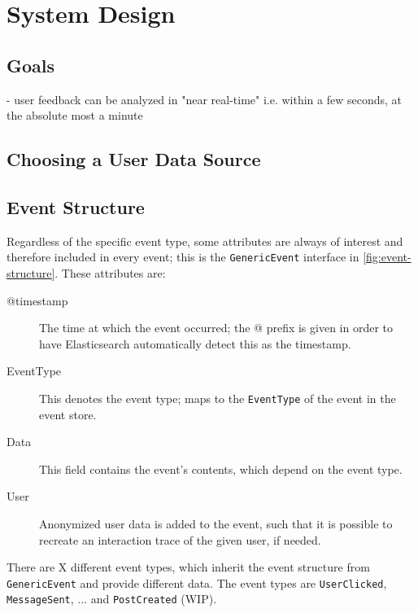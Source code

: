 %
\chapter{System Design}
\label{ch:design}

\section{Goals}
\label{sec:design:goals}

- user feedback can be analyzed in "near real-time" i.e. within a few seconds, at the absolute most a minute 

\section{Choosing a User Data Source}


\section{Event Structure}
\label{sec:design:event-structure}

Regardless of the specific event type, some attributes are always of interest and therefore included in every event; this is the \texttt{GenericEvent} interface in \cref{fig:event-structure}.
These attributes are:

\begin{description}
\item[@timestamp] The time at which the event occurred; the @ prefix is given in order to have Elasticsearch automatically detect this as the timestamp.
\item[EventType] This denotes the event type; maps to the \texttt{EventType} of the event in the event store.
\item[Data] This field contains the event's contents, which depend on the event type.
\item[User] Anonymized user data is added to the event, such that it is possible to recreate an interaction trace of the given user, if needed.
\end{description}

There are X different event types, which inherit the event structure from \texttt{GenericEvent} and provide different data.
The event types are \texttt{UserClicked}, \texttt{MessageSent}, ... and \texttt{PostCreated} (WIP).

